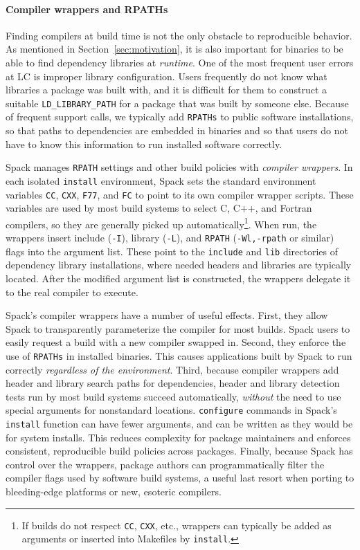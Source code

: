 \paragraph{Compiler wrappers and RPATHs}
Finding compilers at build time is not the only obstacle to reproducible
behavior.  As mentioned in Section~\ref{sec:motivation}, it is also important
for binaries to be able to find dependency libraries at {\it runtime}.
One of the most frequent user errors at LC is improper library configuration.
Users frequently do not know what libraries a package was built with, and 
it is difficult for them to construct a suitable {\tt LD\_LIBRARY\_PATH} for
a package that was built by someone else.  Because of frequent support calls,
we typically add {\tt RPATHs} to public software installations, so that paths
to dependencies are embedded in binaries and so that users do not have to know
this information to run installed software correctly.

Spack manages {\tt RPATH} settings and other build policies with
{\it compiler wrappers}. 
In each isolated {\tt install} environment, Spack sets the standard 
environment variables
{\tt CC}, {\tt CXX}, {\tt F77}, and {\tt FC} to point to its own compiler
wrapper scripts.  These variables are used by most build systems to select
C, C++, and Fortran compilers, so they are generally picked up 
automatically\footnote{If builds do not respect {\tt CC}, {\tt CXX}, etc.,
wrappers can typically be added as arguments or inserted into Makefiles
by {\tt install}.}.
When run, the wrappers insert include ({\tt -I}), library ({\tt -L}), and 
{\tt RPATH} ({\tt -Wl,-rpath} or similar) flags into the argument list.
These point to the {\tt include} and {\tt lib} directories of dependency
library installations, where needed headers and libraries are typically located.
After the modified argument list is constructed, the wrappers delegate it
to the real compiler to execute.

Spack's compiler wrappers have a number of useful effects.  First, they allow
Spack to transparently parameterize the compiler for most builds. 
Spack users to easily request a build with a new compiler swapped in.
Second, they enforce the use of {\tt RPATHs} in
installed binaries.  This causes applications built by Spack to run correctly
{\it regardless of the environment}.  Third, because compiler wrappers add 
header and library search paths for dependencies, header and library detection
tests run by most build systems succeed automatically, {\it without}
the need to use special arguments for nonstandard locations.  {\tt configure}
commands in Spack's {\tt install} function can have fewer arguments, and can
be written as they would be for system installs.  This reduces complexity
for package maintainers and enforces consistent, reproducible
build policies across packages.  Finally, because Spack has control over the 
wrappers, package authors can programmatically filter the compiler flags
used by software build systems, a useful last resort when porting to
bleeding-edge platforms or new, esoteric compilers.

